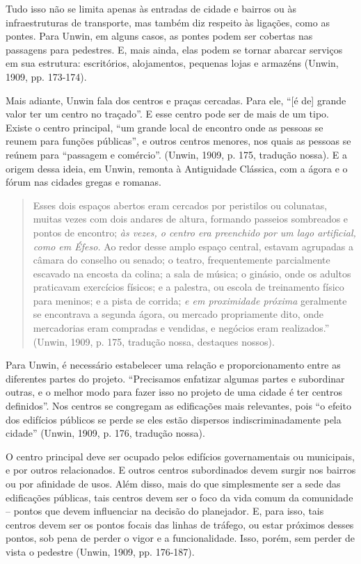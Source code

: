 \documentclass[12pt, a4paper]{book} %
\begin{document}
        Tudo isso não se limita apenas às entradas de cidade e bairros ou às infraestruturas de transporte, mas também diz respeito às ligações, como as pontes. Para Unwin, em alguns casos, as pontes podem ser cobertas nas passagens para pedestres. E, mais ainda, elas podem se tornar abarcar serviços em sua estrutura: escritórios, alojamentos, pequenas lojas e armazéns (Unwin, 1909, pp. 173-174).

        Mais adiante, Unwin fala dos centros e praças cercadas. Para ele, ``[é de] grande valor ter um centro no traçado''. E esse centro pode ser de mais de um tipo. Existe o centro principal, ``um grande local de encontro onde as pessoas se reunem para funções públicas'', e outros centros menores, nos quais as pessoas se reúnem para ``passagem e comércio''. (Unwin, 1909, p. 175, tradução nossa). E a origem dessa ideia, em Unwin, remonta à Antiguidade Clássica, com a ágora e o fórum nas cidades gregas e romanas.

        \begin{quotation}
            Esses dois espaços abertos eram cercados por peristilos ou colunatas, muitas vezes com dois andares de altura, formando passeios sombreados e pontos de encontro; \textit{às vezes, o centro era preenchido por um lago artificial, como em Éfeso.} Ao redor desse amplo espaço central, estavam agrupadas a câmara do conselho ou senado; o teatro, frequentemente parcialmente escavado na encosta da colina; a sala de música; o ginásio, onde os adultos praticavam exercícios físicos; e a palestra, ou escola de treinamento físico para meninos; e a pista de corrida; \textit{e em proximidade próxima} geralmente se encontrava a segunda ágora, ou mercado propriamente dito, onde mercadorias eram compradas e vendidas, e negócios eram realizados.'' (Unwin, 1909, p. 175, tradução nossa, destaques nossos).
        \end{quotation}

        Para Unwin, é necessário estabelecer uma relação e proporcionamento entre as diferentes partes do projeto. ``Precisamos enfatizar algumas partes e subordinar outras, e o melhor modo para fazer isso no projeto de uma cidade é ter centros definidos''. Nos centros se congregam as edificações mais relevantes, pois ``o efeito dos edifícios públicos se perde se eles estão dispersos indiscriminadamente pela cidade'' (Unwin, 1909, p. 176, tradução nossa).

        O centro principal deve ser ocupado pelos edifícios governamentais ou municipais, e por outros relacionados. E outros centros subordinados devem surgir nos bairros ou por afinidade de usos. Além disso, mais do que simplesmente ser a sede das edificações públicas, tais centros devem ser o foco da vida comum da comunidade – pontos que devem influenciar na decisão do planejador. E, para isso, tais centros devem ser os pontos focais das linhas de tráfego, ou estar próximos desses pontos, sob pena de perder o vigor e a funcionalidade. Isso, porém, sem perder de vista o pedestre (Unwin, 1909, pp. 176-187).
\end{document}
